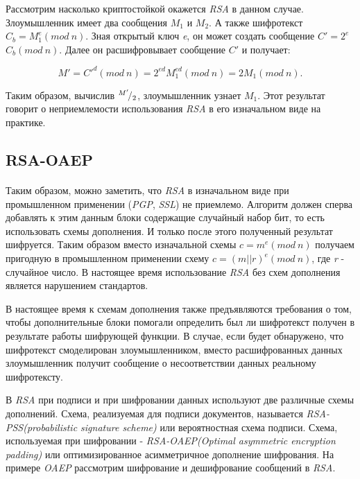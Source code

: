   Рассмотрим насколько криптостойкой окажется \textit{RSA} в данном случае. Злоумышленник имеет два сообщения {$M_1$} и 
  {$M_2$}. А также шифротекст {$C_{b}=M^{e}_{1}(mod \: n)$}. Зная открытый ключ \textit{e}, он может 
  создать сообщение $C'=2^{e}$ $C_{b}(mod \: n)$. Далее он расшифровывает сообщение $C'$ и получает:

    \begin{equation}
      \textit{{$M'=C'^d(mod \: n)=2^{e d}M_{1}^{e d}(mod \: n)=2M_{1}(mod \: n).$}} 
    \end{equation}

  Таким образом, вычислив {${}^{M'}\!/_{2}$}, злоумышленник узнает {$M_1$}. Этот результат говорит о неприемлемости использования \textit{RSA} в его изначальном виде на практике.

\subsection{RSA-OAEP}

\paragraph{} Таким образом, можно заметить, что \textit{RSA} в изначальном виде при промышленном применении (\textit{PGP}, \textit{SSL}) не приемлемо. Алгоритм должен сперва добавлять к этим данным блоки содержащие случайный набор бит, то есть использовать схемы дополнения. И только после этого полученный
  результат шифруется. Таким образом вместо изначальной схемы {$c=m^{e}(mod \: n)$} получаем пригодную в промышленном применении схему 
  {$c=(m||r)^{e}(mod \: n)$}, где \textit{r} - случайное число. В настоящее время использование
  \textit{RSA} без схем дополнения является нарушением стандартов.

  В настоящее время к схемам дополнения также предъявляются требования о том, чтобы дополнительные блоки помогали определить был ли шифротекст получен в результате работы 
  шифрующей функции. В случае, если будет обнаружено, что шифротекст смоделирован злоумышленником, вместо расшифрованных данных 
  злоумышленник получит сообщение о несоответствии данных реальному шифротексту.

  В \textit{RSA} при подписи и при шифровании данных используют две различные схемы дополнений. Схема, реализуемая для подписи документов, называется 
  \textit{RSA-PSS(probabilistic signature scheme)} или вероятностная схема подписи. Схема, используемая при шифровании - 
  \textit{RSA-OAEP(Optimal asymmetric encryption padding)} или оптимизированное асимметричное дополнение шифрования. На примере \textit{OAEP} рассмотрим 
  шифрование и дешифрование сообщений в \textit{RSA}.

